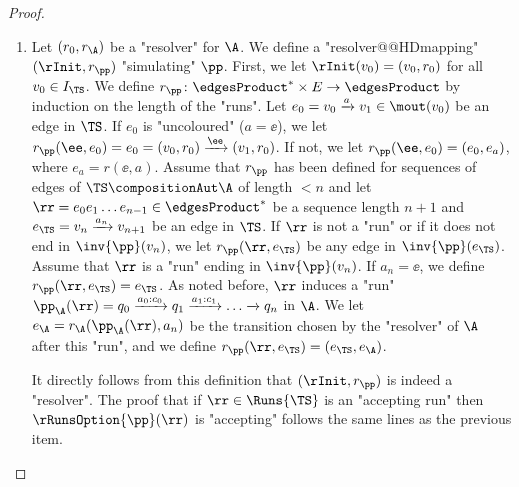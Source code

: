 \documentclass[10pt,a4paper]{amsart}
\newcommand{\re}[1]{\xrightarrow{#1}}
\begin{document}
\begin{proof}
\begin{enumerate}
		Let $\rr$ be a "rejecting run" in $\TS\compositionAut \A$ (we use the notations introduced above). In that case, $c_0c_1c_2\dots \notin \WW_\A$, and therefore $\pp_\A(\rr)$ is a "rejecting run" over $a_0a_1a_2\dots$. Since $\A$ is "deterministic", this is the only "run over" $a_0a_1a_2\dots$, so we conclude that it does not belong to $\WW.$ We conclude that $\ppRuns(\rr)$ is a "rejecting run" in $\TS$.
		
		\item Let $(r_0, r_\A)$ be a "resolver" for $\A$. We define a "resolver@@HDmapping" $(\rInit, r_\pp)$ "simulating" $\pp$. First, we let $\rInit(v_0) = (v_0,r_0)$ for all $v_0\in I_\TS$. We define $r_\pp\colon {\edgesProduct}^*\times E \to \edgesProduct$ by induction on the length of the "runs". 
		Let $e_0 = v_0\re{a}v_1\in \mout(v_0)$ be an edge in $\TS$. If $e_0$ is "uncoloured" ($a=\ee$), we let $r_\pp(\ee, e_0) = e_0 = (v_0,r_0)\re{\ee}(v_1,r_0)$. If not, we let $r_\pp(\ee, e_0) = (e_0, e_a)$, where $e_a = r(\ee,a)$. 
		Assume that $r_\pp$ has been defined for sequences of edges of $\TS \compositionAut \A$ of length $< n$ and let  $\rr =e_0e_1\dots e_{n-1}\in {\edgesProduct}^*$ be a sequence length $n+1$ and $e_\TS = v_n\re{a_n} v_{n+1}$ be an edge in $\TS$.
		If $\rr$ is not a "run" or if it does not end in $\inv{\pp}(v_n)$, we let $r_\pp(\rr, e_\TS)$ be any edge in $\inv{\pp}(e_\TS)$.
		Assume that $\rr$ is a "run" ending in $\inv{\pp}(v_n)$. If $a_n = \ee$, we define $r_\pp(\rr, e_\TS) = e_\TS$. As noted before, $\rr$ induces a "run" $\pp_\A(\rr) = q_0 \re{a_0:c_0}  q_1 \re{a_1:c_1} \dots \re{}q_n$ in $\A$. We let $e_\A = r_\A(\pp_\A(\rr), a_n)$ be the transition chosen by the "resolver" of $\A$ after this "run",  and we define $r_\pp(\rr, e_\TS) = (e_\TS, e_\A)$.
		
		It directly follows from this definition that $(\rInit, r_\pp)$ is indeed a "resolver". The proof that if $\rr\in \Runs{\TS}$ is an "accepting run" then $\rRunsOption{\pp}(\rr)$ is "accepting" follows the same lines as the previous item.
		

\end{enumerate}
\end{proof}
\end{document}
